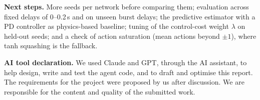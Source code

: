 \documentclass[10pt,a4paper]{article}
\begin{document}
\textbf{Next steps.} More seeds per network before comparing them; evaluation across fixed delays of
0--0.2\,s and on unseen burst delays; the predictive estimator with a PD controller as physics-based
baseline; tuning of the control-cost weight $\lambda$ on held-out seeds;
and a check of action saturation (mean actions beyond $\pm1$), where tanh squashing is the fallback.

\textbf{AI tool declaration.} We used Claude and GPT, through the AI assistant, to help design, write and
test the agent code, and to draft and optimise this report. The requirements for the project were proposed by us after
discussion. We are responsible for the content and quality of the submitted work.
\end{document}
